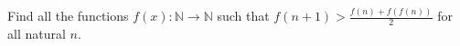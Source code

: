 \problem
Find all the functions $f(x) \colon \mathbb{N} \to \mathbb{N}$ such that
\(
    f(n + 1) > \frac{f(n) + f(f(n))}{2}
\)
for all natural $n$. 
\solution
\endproblem

